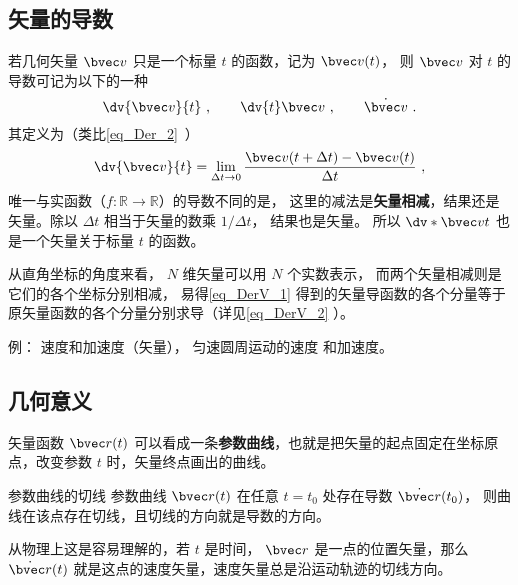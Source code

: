 
\begin{issues}
\end{issues}



\subsection{矢量的导数}

若几何矢量 $\bvec v$ 只是一个标量 $t$ 的函数，记为 $\bvec v(t)$， 则 $\bvec v$ 对 $t$ 的导数可记为以下的一种
\begin{equation}
\dv{\bvec v}{t}~, \qquad \dv{t}\bvec v~, \qquad \dot{\bvec v}~.
\end{equation}
其定义为（类比\autoref{eq_Der_2}~）
\begin{equation}\label{eq_DerV_1}
\dv{\bvec v}{t} = \lim_{\Delta t \to 0} \frac{\bvec v ( t + \Delta t) - \bvec v(t)}{\Delta t}~,
\end{equation}
唯一与实函数（$f:\mathbb R \to \mathbb R$）的导数不同的是， 这里的减法是\textbf{矢量相减}，结果还是矢量。除以 $\Delta t$ 相当于矢量的数乘 $1/\Delta t$， 结果也是矢量。 所以 $\dv*{\bvec v}{t}$ 也是一个矢量关于标量 $t$ 的函数。

从直角坐标的角度来看， $N$ 维矢量可以用 $N$ 个实数表示， 而两个矢量相减则是它们的各个坐标分别相减， 易得\autoref{eq_DerV_1} 得到的矢量导函数的各个分量等于原矢量函数的各个分量分别求导（详见\autoref{eq_DerV_2} ）。

例： 速度和加速度（矢量）， 匀速圆周运动的速度 和加速度。

\subsection{几何意义}
矢量函数 $\bvec r(t)$ 可以看成一条\textbf{参数曲线}，也就是把矢量的起点固定在坐标原点，改变参数 $t$ 时，矢量终点画出的曲线。

\begin{theorem}{参数曲线的切线}
参数曲线 $\bvec r(t)$ 在任意 $t=t_0$ 处存在导数 $\dot{\bvec r}(t_0)$， 则曲线在该点存在切线，且切线的方向就是导数的方向。
\end{theorem}

从物理上这是容易理解的，若 $t$ 是时间， $\bvec r$ 是一点的位置矢量，那么 $\dot{\bvec r}(t)$ 就是这点的速度矢量，速度矢量总是沿运动轨迹的切线方向。

